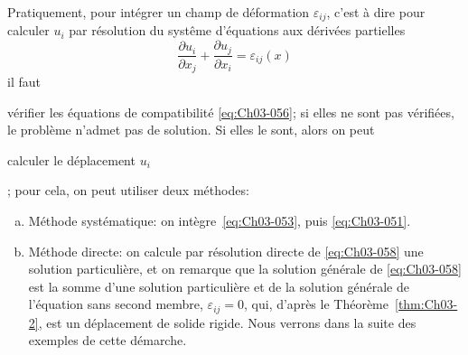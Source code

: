 Pratiquement, pour intégrer un champ de déformation $\varepsilon_{ij}$, c'est à dire pour calculer $u_i$ par résolution du systême d'équations aux dérivées partielles 
\begin{equation}
    \frac{\partial u_i}{\partial x_j} + \frac{\partial u_j}{\partial x_i} = \varepsilon_{ij} (x)
    \label{eq:Ch03-058}
\end{equation}
il faut \begin{inparaenum}[(1)]
\item vérifier les équations de compatibilité \eqref{eq:Ch03-056}; si elles ne sont pas vérifiées, le problème n'admet pas de solution.
    Si elles le sont, alors on peut 
\item calculer le déplacement $u_i$
\end{inparaenum}; pour cela, on peut utiliser deux méthodes:
\begin{enumerate}[(a)]
    \item Méthode systématique: on intègre~\eqref{eq:Ch03-053}, puis \eqref{eq:Ch03-051}.
    \item Méthode directe: on calcule par résolution directe de \eqref{eq:Ch03-058} une solution particulière, et on remarque que la solution générale de \eqref{eq:Ch03-058} est la somme d'une solution particulière et de la solution générale de l'équation sans second membre, $\varepsilon_{ij} = 0$, qui, d'après le Théorème~\ref{thm:Ch03-2}, est un déplacement de solide rigide.
        Nous verrons dans la suite des exemples de cette démarche.
\end{enumerate}

